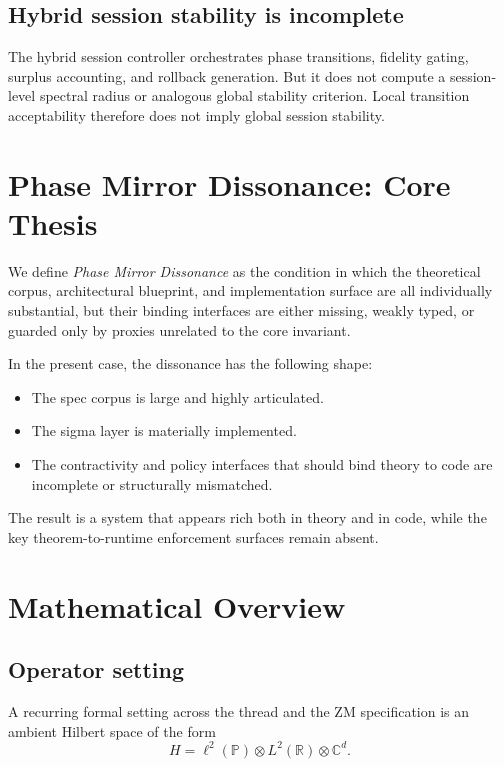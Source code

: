 \documentclass[11pt]{article}
\begin{document}
\subsection{Hybrid session stability is incomplete}

The hybrid session controller orchestrates phase transitions, fidelity gating, surplus accounting, and rollback generation. But it does not compute a session-level spectral radius or analogous global stability criterion. Local transition acceptability therefore does not imply global session stability.

\section{Phase Mirror Dissonance: Core Thesis}

We define \emph{Phase Mirror Dissonance} as the condition in which the theoretical corpus, architectural blueprint, and implementation surface are all individually substantial, but their binding interfaces are either missing, weakly typed, or guarded only by proxies unrelated to the core invariant.

In the present case, the dissonance has the following shape:

\begin{itemize}
\item The spec corpus is large and highly articulated.
\item The sigma layer is materially implemented.
\item The contractivity and policy interfaces that should bind theory to code are incomplete or structurally mismatched.
\end{itemize}

The result is a system that appears rich both in theory and in code, while the key theorem-to-runtime enforcement surfaces remain absent.

\section{Mathematical Overview}

\subsection{Operator setting}

A recurring formal setting across the thread and the ZM specification is an ambient Hilbert space of the form
\[
H = \ell^2(\mathbb{P}) \otimes L^2(\mathbb{R}) \otimes \mathbb{C}^d.
\]
\end{document}
